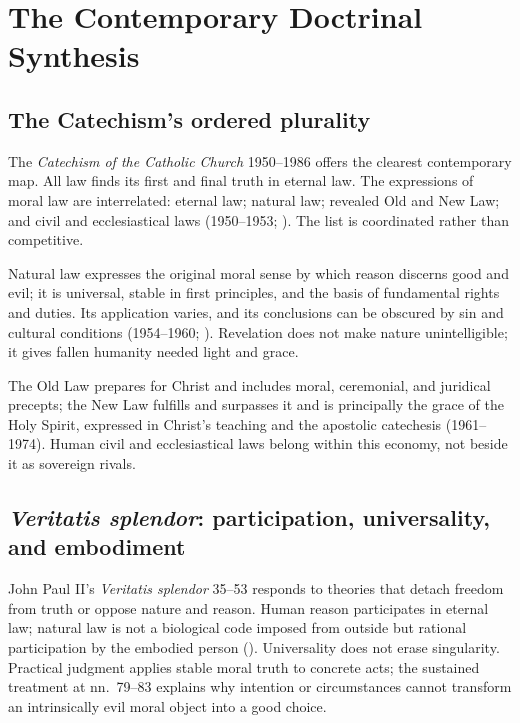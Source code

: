 \section{The Contemporary Doctrinal Synthesis}

\subsection{The Catechism's ordered plurality}

The \emph{Catechism of the Catholic Church} 1950--1986 offers the clearest contemporary map. All law finds its first and final truth in eternal law. The expressions of moral law are interrelated: eternal law; natural law; revealed Old and New Law; and civil and ecclesiastical laws (1950--1953; ). The list is coordinated rather than competitive.

Natural law expresses the original moral sense by which reason discerns good and evil; it is universal, stable in first principles, and the basis of fundamental rights and duties. Its application varies, and its conclusions can be obscured by sin and cultural conditions (1954--1960; ). Revelation does not make nature unintelligible; it gives fallen humanity needed light and grace.

The Old Law prepares for Christ and includes moral, ceremonial, and juridical precepts; the New Law fulfills and surpasses it and is principally the grace of the Holy Spirit, expressed in Christ's teaching and the apostolic catechesis (1961--1974). Human civil and ecclesiastical laws belong within this economy, not beside it as sovereign rivals.

\subsection{\emph{Veritatis splendor}: participation, universality, and embodiment}

John Paul II's \emph{Veritatis splendor} 35--53 responds to theories that detach freedom from truth or oppose nature and reason. Human reason participates in eternal law; natural law is not a biological code imposed from outside but rational participation by the embodied person (). Universality does not erase singularity. Practical judgment applies stable moral truth to concrete acts; the sustained treatment at nn.~79--83 explains why intention or circumstances cannot transform an intrinsically evil moral object into a good choice.

